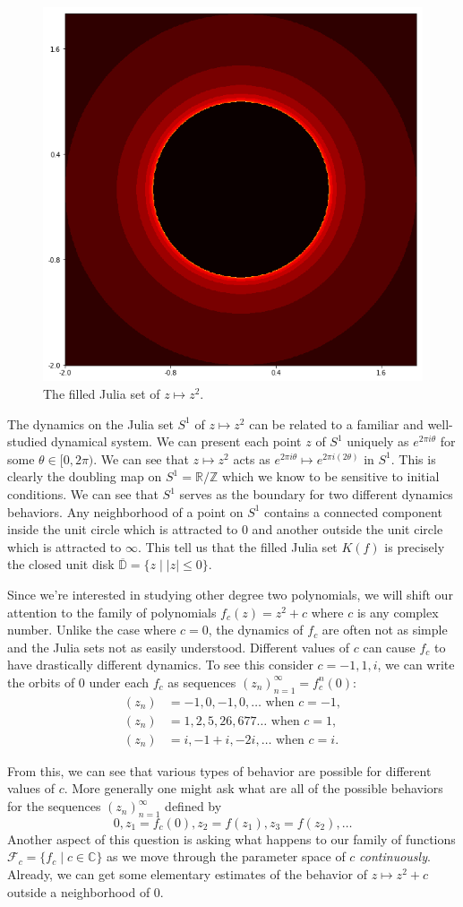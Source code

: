 \documentclass{amsart}
\newcommand{\bbR}{\mathbb{R}}
\newcommand{\bbZ}{\mathbb{Z}}
\newcommand{\bbC}{\mathbb{C}}
\newcommand{\cal}[1]{ \mathcal{#1}}
\newcommand{\abs}[1]{ \left| #1 \right| }
\theoremstyle{definition}
\theoremstyle{remark}
\numberwithin{equation}{section}
\begin{document}
\begin{figure}[h]
\centering
\includegraphics[width=0.33\linewidth]{Juliaz2.png}
\caption{The filled Julia set of $z\mapsto z^2$.}

\end{figure}

The dynamics on the Julia set $S^1$ of $z\mapsto z^2$ can be related to a familiar and well-studied dynamical system. We can present each point $z$ of $S^1$ uniquely as $e^{2\pi i \theta}$ for some $\theta\in[0,2\pi)$. We can see that $z\mapsto z^2$ acts as $e^{2\pi i \theta}\mapsto e^{2\pi i (2\theta)}$ in $S^1$. This is clearly the doubling map on $S^1=\bbR/\bbZ$ which we know to be sensitive to initial conditions. We can see that $S^1$ serves as the boundary for two different dynamics behaviors. Any neighborhood of a point on $S^1$ contains a connected component inside the unit circle which is attracted to $0$ and another outside the unit circle which is attracted to $\infty$. This tell us that the filled Julia set $K(f)$ is precisely the closed unit disk $\overline{\mathbb{D}}=\{z\mid \abs{z}\leq 0\}$.


Since we're interested in studying other degree two polynomials, we will shift our attention to the family of polynomials $f_c(z)=z^2+c$ where $c$ is any complex number. Unlike the case where $c=0$, the dynamics of $f_c$ are often not as simple and the Julia sets not as easily understood. Different values of $c$ can cause $f_c$ to have drastically different dynamics. To see this consider $c=-1,1, i $, we can write the orbits of 0 under each $f_c$ as sequences $(z_n)_{n=1}^\infty=f^n_c(0)$:
\begin{align}
   (z_n)&=-1, 0 , -1, 0, \ldots \text{\ \ when $c=-1$}, \\
    (z_n)&=1, 2, 5, 26, 677 \ldots\text{ when $c=1$}, \\
  (z_n)&=i, -1+i, -2i, \ldots \text{ when $c=i$}.
\end{align}

From this, we can see that various types of behavior are possible for different values of $c$. More generally one might ask what are all of the possible behaviors for the sequences $(z_n)_{n=1}^\infty$ defined by \[
0, z_1=f_c(0), z_2=f(z_1), z_3=f(z_2), \ldots
\] Another aspect of this question is asking what happens to our family of functions $\cal{F}_c=\{f_c\mid c\in\bbC\}$ as we move through the parameter space of $c$ \emph{continuously}. Already, we can get some elementary estimates of the behavior of $z\mapsto z^2+c$ outside a neighborhood of 0.
\end{document}
